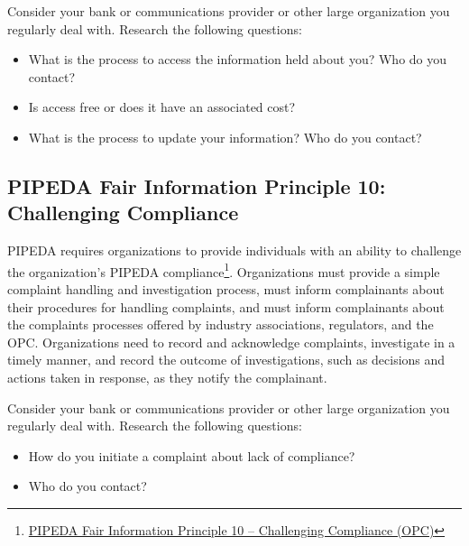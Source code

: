\begin{exerciseboxcomputer}

Consider your bank or communications provider or other large organization you regularly deal with. Research the following questions:

\begin{itemize}
  \item What is the process to access the information held about you? Who do you contact?
  \item Is access free or does it have an associated cost?
  \item What is the process to update your information? Who do you contact?
\end{itemize}
\end{exerciseboxcomputer}

\subsection*{PIPEDA Fair Information Principle 10: Challenging Compliance}

PIPEDA requires organizations to provide individuals with an ability to challenge the organization's PIPEDA compliance\footnote{\href{https://www.priv.gc.ca/en/privacy-topics/privacy-laws-in-canada/the-personal-information-protection-and-electronic-documents-act-pipeda/p_principle/principles/p_compliance/}{PIPEDA Fair Information Principle 10 -- Challenging Compliance (OPC)}}. Organizations must provide a simple complaint handling and investigation process, must inform complainants about their procedures for handling complaints, and must inform complainants about the complaints processes offered by industry associations, regulators, and the OPC. Organizations need to record and acknowledge complaints, investigate in a timely manner, and record the outcome of investigations, such as decisions and actions taken in response, as they notify the complainant. 

\begin{exerciseboxcomputer}

Consider your bank or communications provider or other large organization you regularly deal with. Research the following questions:
\begin{itemize}
  \item How do you initiate a complaint about lack of compliance?
  \item Who do you contact?
\end{itemize}
\end{exerciseboxcomputer}


